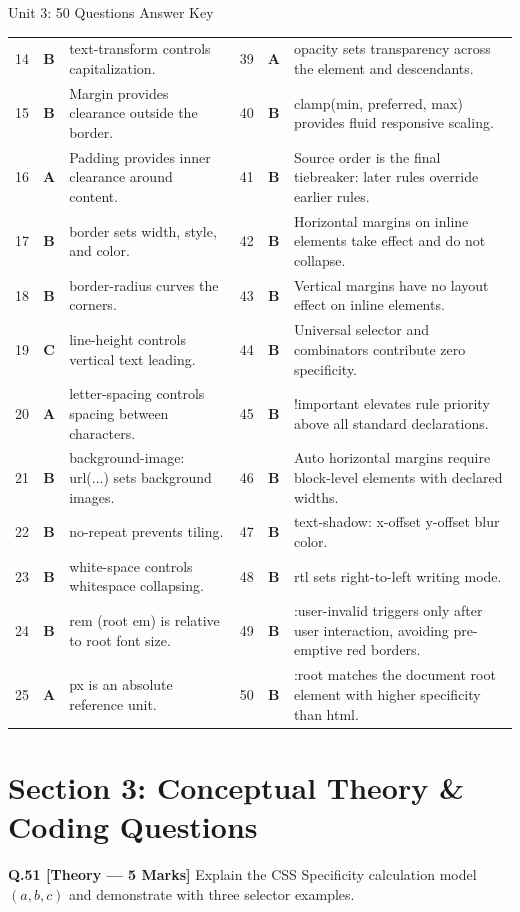 \begin{answerkeytable}{Unit 3: 50 Questions Answer Key}
\begin{tabularx}{\textwidth}{l c X l c X}
14 & \textbf{B} & text-transform controls capitalization. & 39 & \textbf{A} & opacity sets transparency across the element and descendants. \\
15 & \textbf{B} & Margin provides clearance outside the border. & 40 & \textbf{B} & clamp(min, preferred, max) provides fluid responsive scaling. \\
16 & \textbf{A} & Padding provides inner clearance around content. & 41 & \textbf{B} & Source order is the final tiebreaker: later rules override earlier rules. \\
17 & \textbf{B} & border sets width, style, and color. & 42 & \textbf{B} & Horizontal margins on inline elements take effect and do not collapse. \\
18 & \textbf{B} & border-radius curves the corners. & 43 & \textbf{B} & Vertical margins have no layout effect on inline elements. \\
19 & \textbf{C} & line-height controls vertical text leading. & 44 & \textbf{B} & Universal selector and combinators contribute zero specificity. \\
20 & \textbf{A} & letter-spacing controls spacing between characters. & 45 & \textbf{B} & !important elevates rule priority above all standard declarations. \\
21 & \textbf{B} & background-image: url(...) sets background images. & 46 & \textbf{B} & Auto horizontal margins require block-level elements with declared widths. \\
22 & \textbf{B} & no-repeat prevents tiling. & 47 & \textbf{B} & text-shadow: x-offset y-offset blur color. \\
23 & \textbf{B} & white-space controls whitespace collapsing. & 48 & \textbf{B} & rtl sets right-to-left writing mode. \\
24 & \textbf{B} & rem (root em) is relative to root font size. & 49 & \textbf{B} & :user-invalid triggers only after user interaction, avoiding pre-emptive red borders. \\
25 & \textbf{A} & px is an absolute reference unit. & 50 & \textbf{B} & :root matches the document root element with higher specificity than html. \\
\bottomrule
\end{tabularx}
\end{answerkeytable}

\section{Section 3: Conceptual Theory \& Coding Questions}
\noindent\textbf{Q.51 [Theory --- 5 Marks]} Explain the CSS Specificity calculation model $(a, b, c)$ and demonstrate with three selector examples.

